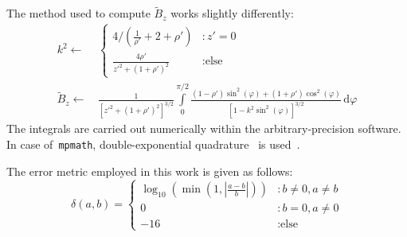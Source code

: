 The method used to compute $\tilde{B}_z$ works slightly differently:
\begin{align}
 k^2 \leftarrow&\,
  \begin{cases}
    4 / \left( \frac{1}{\rho'} + 2 + \rho' \right)    &: z' = 0 \\
    \frac{4 \rho'}{{z'}^2 + \left(1 + \rho'\right)^2} &: \textrm{else}
  \end{cases} \nonumber \\
 \tilde{B}_z \leftarrow&\,
   \frac{1}{\left[ {z'}^2 + \left(1 + \rho'\right)^2 \right]^{3/2} }
                                 \int\limits_0^{\pi/2}
                                   \frac{(1-\rho') \sin^2(\varphi) + (1+\rho') \cos^2(\varphi)}
                                        {\left[1 - k^2 \sin^2(\varphi) \right]^{3/2}} \,\mathrm{d}\varphi
\end{align}
The integrals are carried out numerically within the arbitrary-precision software.
In case of~\texttt{mpmath}, double-exponential quadrature~\cite{double_exp_quad} is used~\cite{mpmath_quad}.




The error metric employed in this work is given as follows:
\begin{equation}
 \delta(a, b)
 = \begin{cases}
    \log_{10} \left(\min\left(1, \left| \frac{a - b}{b} \right|\right) \right) &: b \neq 0, a \neq b \\
    0                                                                          &: b=0, a \neq 0 \\
    -16                                                                        &: \textrm{else}
   \end{cases}
\end{equation}



